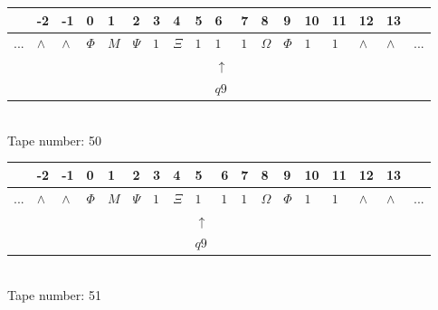 \documentclass[11pt]{article}
\begin{document}
\begin{table}[H]
\centering
\begin{tabular}{llllllllllllllllll}
 & -2 & -1 & 0 & 1 & 2 & 3 & 4 & 5 & 6 & 7 & 8 & 9 & 10 & 11 & 12 & 13 & \\
\hline
$...$ & \multicolumn{1}{|l|}{$\wedge$} & \multicolumn{1}{|l|}{$\wedge$} & \multicolumn{1}{|l|}{$\Phi$} & \multicolumn{1}{|l|}{$M$} & \multicolumn{1}{|l|}{$\Psi$} & \multicolumn{1}{|l|}{$1$} & \multicolumn{1}{|l|}{$\Xi$} & \multicolumn{1}{|l|}{$1$} & \multicolumn{1}{|l|}{$1$} & \multicolumn{1}{|l|}{$1$} & \multicolumn{1}{|l|}{$\Omega$} & \multicolumn{1}{|l|}{$\Phi$} & \multicolumn{1}{|l|}{$1$} & \multicolumn{1}{|l|}{$1$} & \multicolumn{1}{|l|}{$\wedge$} & \multicolumn{1}{|l|}{$\wedge$} & $...$\\
\hline
&  &  &  &  &  &  &  &  & $\uparrow$ &  &  &  &  &  &  &  &  \\
&  &  &  &  &  &  &  &  & $ q9 $ &  &  &  &  &  &  &  &  \\
\end{tabular}
\\
Tape number: 50
\noindent\makebox[\linewidth]{\hdashrule{\textwidth}{1pt}{1pt}}\end{table}

\begin{table}[H]
\centering
\begin{tabular}{llllllllllllllllll}
 & -2 & -1 & 0 & 1 & 2 & 3 & 4 & 5 & 6 & 7 & 8 & 9 & 10 & 11 & 12 & 13 & \\
\hline
$...$ & \multicolumn{1}{|l|}{$\wedge$} & \multicolumn{1}{|l|}{$\wedge$} & \multicolumn{1}{|l|}{$\Phi$} & \multicolumn{1}{|l|}{$M$} & \multicolumn{1}{|l|}{$\Psi$} & \multicolumn{1}{|l|}{$1$} & \multicolumn{1}{|l|}{$\Xi$} & \multicolumn{1}{|l|}{$1$} & \multicolumn{1}{|l|}{$1$} & \multicolumn{1}{|l|}{$1$} & \multicolumn{1}{|l|}{$\Omega$} & \multicolumn{1}{|l|}{$\Phi$} & \multicolumn{1}{|l|}{$1$} & \multicolumn{1}{|l|}{$1$} & \multicolumn{1}{|l|}{$\wedge$} & \multicolumn{1}{|l|}{$\wedge$} & $...$\\
\hline
&  &  &  &  &  &  &  & $\uparrow$ &  &  &  &  &  &  &  &  &  \\
&  &  &  &  &  &  &  & $ q9 $ &  &  &  &  &  &  &  &  &  \\
\end{tabular}
\\
Tape number: 51
\noindent\makebox[\linewidth]{\hdashrule{\textwidth}{1pt}{1pt}}\end{table}
\end{document}
